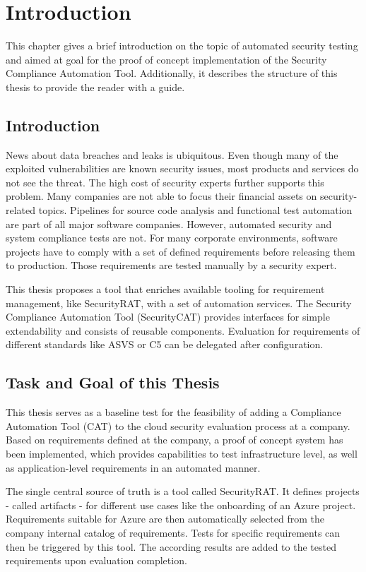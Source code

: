 \addchapheadtotoc
\chapter{Introduction}
This chapter gives a brief introduction on the topic of automated security testing and aimed at goal for the proof of concept implementation of the Security Compliance Automation Tool. Additionally, it describes the structure of this thesis to provide the reader with a guide.

\section{Introduction}
News about data breaches and leaks is ubiquitous. Even though many of the exploited vulnerabilities are known security issues, most products and services do not see the threat. The high cost of security experts further supports this problem. Many companies are not able to focus their financial assets on security-related topics.
Pipelines for source code analysis and functional test automation are part of all major software companies. However, automated security and system compliance tests are not. For many corporate environments, software projects have to comply with a set of defined requirements before releasing them to production. Those requirements are tested manually by a security expert.

This thesis proposes a tool that enriches available tooling for requirement management, like SecurityRAT, with a set of automation services. The Security Compliance Automation Tool (SecurityCAT) provides interfaces for simple extendability and consists of reusable components. Evaluation for requirements of different standards like ASVS \citep{asvs4.0} or C5 \citep{bsiC5} can be delegated after configuration.


\section{Task and Goal of this Thesis}
This thesis serves as a baseline test for the feasibility of adding a Compliance Automation Tool (CAT) to the cloud security evaluation process at a company. Based on requirements defined at the company, a proof of concept system has been implemented, which provides capabilities to test infrastructure level, as well as application-level requirements in an automated manner.

The single central source of truth is a tool called SecurityRAT. It defines projects - called artifacts - for different use cases like the onboarding of an Azure project. Requirements suitable for Azure are then automatically selected from the company internal catalog of requirements. Tests for specific requirements can then be triggered by this tool. The according results are added to the tested requirements upon evaluation completion. 


